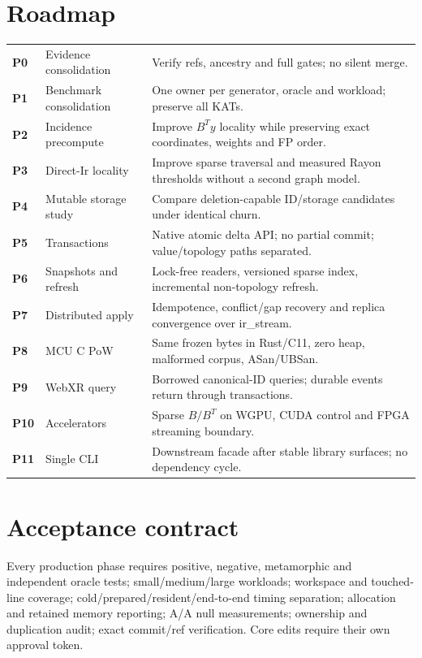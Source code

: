 \documentclass[11pt,a4paper]{article}
\begin{document}
\section{Roadmap}
\begin{longtable}{>{\bfseries}p{10mm} p{35mm} p{94mm}}
P0 & Evidence consolidation & Verify refs, ancestry and full gates; no silent merge.\\
P1 & Benchmark consolidation & One owner per generator, oracle and workload; preserve all KATs.\\
P2 & Incidence precompute & Improve $B^Ty$ locality while preserving exact coordinates, weights and FP order.\\
P3 & Direct-Ir locality & Improve sparse traversal and measured Rayon thresholds without a second graph model.\\
P4 & Mutable storage study & Compare deletion-capable ID/storage candidates under identical churn.\\
P5 & Transactions & Native atomic delta API; no partial commit; value/topology paths separated.\\
P6 & Snapshots and refresh & Lock-free readers, versioned sparse index, incremental non-topology refresh.\\
P7 & Distributed apply & Idempotence, conflict/gap recovery and replica convergence over ir\_stream.\\
P8 & MCU C PoW & Same frozen bytes in Rust/C11, zero heap, malformed corpus, ASan/UBSan.\\
P9 & WebXR query & Borrowed canonical-ID queries; durable events return through transactions.\\
P10 & Accelerators & Sparse $B/B^T$ on WGPU, CUDA control and FPGA streaming boundary.\\
P11 & Single CLI & Downstream facade after stable library surfaces; no dependency cycle.\\
\end{longtable}

\section{Acceptance contract}
Every production phase requires positive, negative, metamorphic and independent
oracle tests; small/medium/large workloads; workspace and touched-line coverage;
cold/prepared/resident/end-to-end timing separation; allocation and retained
memory reporting; A/A null measurements; ownership and duplication audit; exact
commit/ref verification. Core edits require their own approval token.
\end{document}
